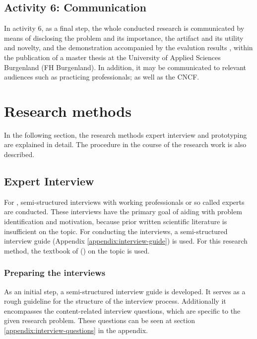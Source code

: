 \subsection{Activity 6: Communication}
\label{methodology:activity6}

\noindent
In activity 6, as a final step,
the whole conducted research is communicated by means of
disclosing
the problem and its importance,
the artifact and its utility and novelty,
and the demonstration accompanied by the evalution results
\autocite{designScienceResearchMethodologyForInformationSystemsResearch},
within the publication of a master thesis at
the University of Applied Sciences Burgenland (FH Burgenland).
In addition, it may be communicated to relevant audiences such as practicing professionals;
as well as the CNCF.


\section{Research methods}

In the following section,
the research methods
expert interview and prototyping
are explained in detail.
The procedure in the course of the research work is also described.

\subsection{Expert Interview}

For ,
semi-structured interviews with working professionals or so called experts
are conducted.
These interviews have the primary goal of aiding with
problem identification and motivation,
because prior written scientific literature is insufficient on the topic.
For conducting the interviews,
a semi-structured interview guide (Appendix \ref{appendix:interview-guide}) is used.
For this research method,
the textbook of
\citeauthor{glaser2010experteninterviews} (\citeyear{glaser2010experteninterviews})
on the topic
is used.

\subsubsection{Preparing the interviews}

As an initial step,
a semi-structured interview guide is developed.
It serves as a rough guideline for the structure of the interview process.
Additionally it encompasses the content-related interview questions,
which are specific to the given research problem.
These questions can be seen at section \ref{appendix:interview-questions} in the appendix.

